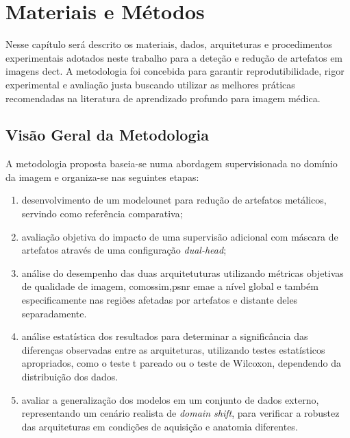 
\chapter{Materiais e Métodos}
\label{chap:metodos}
Nesse capítulo será descrito os materiais, dados, arquiteturas e procedimentos experimentais adotados neste trabalho para a deteção e redução de artefatos em imagens de\Acrfull{ct}. A metodologia foi concebida para garantir reprodutibilidade, rigor experimental e avaliação justa buscando utilizar as melhores práticas recomendadas na literatura de aprendizado profundo para imagem médica. 

\section{Visão Geral da Metodologia}
A metodologia proposta baseia-se numa abordagem supervisionada no domínio da imagem e organiza-se nas seguintes etapas:

\begin{enumerate}
    \item desenvolvimento de um modelo\acrshort{unet} para redução de artefatos metálicos, servindo como referência comparativa;
    \item avaliação objetiva do impacto de uma supervisão adicional com máscara de artefatos através de uma configuração \textit{dual-head};
    \item análise do desempenho das duas arquitetuturas utilizando métricas objetivas de qualidade de imagem, como\acrshort{ssim},\acrshort{psnr} e\acrshort{mae} a nível global e também especificamente nas regiões afetadas por artefatos e distante deles separadamente.
    \item análise estatística dos resultados para determinar a significância das diferenças observadas entre as arquiteturas, utilizando testes estatísticos apropriados, como o teste t pareado ou o teste de Wilcoxon, dependendo da distribuição dos dados.
    \item avaliar a generalização dos modelos em um conjunto de dados externo, representando um cenário realista de \textit{domain shift}, para verificar a robustez das arquiteturas em condições de aquisição e anatomia diferentes.
\end{enumerate}


